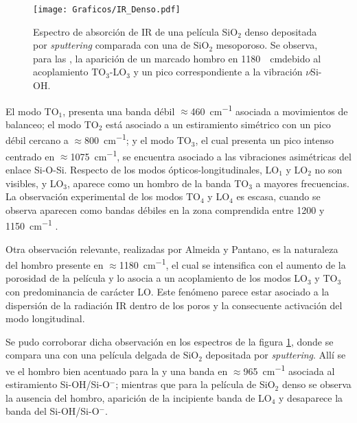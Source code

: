 		 	 \begin{figure}[!ht]
						\begin{center}
						\texttt{[image: Graficos/IR\_Denso.pdf]}
						\caption[FTIR SiO$_2$ denso y SiO$_2$ mesoporoso.]{Espectro de absorción de IR de una película SiO$_2$ denso depositada por \textit{sputtering} comparada con una de SiO$_2$ mesoporoso. Se observa, para las \pdm, la aparición de un marcado hombro en \SI{1180}{\per\cm}debido al acoplamiento TO$_3$-LO$_3$ y un pico correspondiente a la vibración $\nu$Si-OH.}
						\label{fig:IR-denso}
						\end{center}
						\end{figure}

		 El modo TO$_1$, presenta una banda débil $\approx$\SI{460}{\cm^{-1}} asociada a movimientos de balanceo; el modo TO$_2$ está asociado a un estiramiento simétrico con un pico débil cercano a $\approx$\SI{800}{\cm^{-1}}; y el modo TO$_3$, el cual presenta un pico intenso centrado en $\approx$\SI{1075}{\cm^{-1}}, se encuentra asociado a las vibraciones asimétricas del enlace Si-O-Si. Respecto de los modos ópticos-longitudinales, LO$_1$ y LO$_2$ no son visibles, y LO$_3$, aparece como un hombro de la banda TO$_3$ a mayores frecuencias. La observación experimental de los modos TO$_4$ y LO$_4$ es escasa, cuando se observa aparecen como bandas débiles en la zona comprendida entre 1200 y \SI{1150}{\cm^{-1}} \cite{Pai1986,Grosse1986}.
				 	
		 Otra observación relevante, realizadas por Almeida y Pantano\cite{Almeida1990}, es la naturaleza del hombro presente en $\approx$\SI{1180}{\cm^{-1}}, el cual se intensifica con el aumento de la porosidad de la película y lo asocia a un acoplamiento de los modos LO$_3$ y TO$_3$ con predominancia de carácter LO. Este fenómeno parece estar asociado a la dispersión de la radiación IR dentro de los poros y la consecuente activación del modo longitudinal.	
			
		 Se pudo corroborar dicha observación en los espectros de la figura \ref{fig:IR-denso}, donde se compara una \pdm\space con una película delgada de SiO$_2$ depositada por \textit{sputtering}.  Allí se ve el hombro bien acentuado para la \pdm\space y una banda en $\approx$\SI{965}{\cm^{-1}} asociada al estiramiento Si-OH/Si-O$^-$; mientras que para la película de SiO$_2$ denso se observa la ausencia del hombro, aparición de la incipiente banda de LO$_4$ y desaparece la banda del Si-OH/Si-O$^-$.

